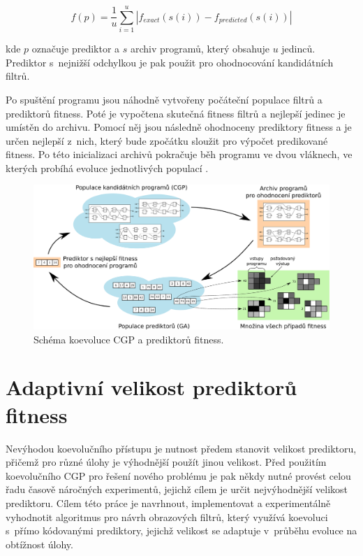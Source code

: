 \documentclass[czech]{ExcelAtFIT} %
\begin{document}
\begin{equation}
    \label{eq:fitnessPredictor}
    f \left( p \right) = \frac{1}{u} \sum\limits_{i=1}^{u} \left| f_{\mathit{exact}} \left( s\left( i \right) \right) - f_{\mathit{predicted}} \left( s\left( i \right) \right) \right|
\end{equation}

\noindent{}kde $p$ označuje prediktor a $s$ archiv programů, který obsahuje $u$ jedinců. Prediktor s~nejnižší odchylkou je pak použit pro ohodnocování kandidátních filtrů.

Po spuštění programu jsou náhodně vytvořeny po\-čá\-teč\-ní populace filtrů a prediktorů fitness. Poté je vypočtena skutečná fitness filtrů a nejlepší jedinec je umís\-těn do archivu. Pomocí něj jsou následně ohod\-no\-ceny prediktory fitness a je určen nejlepší z~nich, který bude zpočátku sloužit pro výpočet predikované fitness. Po této inicializaci archivů pokračuje běh programu ve dvou vláknech, ve kterých probíhá evoluce jed\-not\-li\-vých populací \cite{SikuPPSN}.

\begin{figure}[t]
    \centering\includegraphics[width=0.8\linewidth]{images/coevolution-if.pdf}
    \caption{Schéma koevoluce CGP a prediktorů fitness.}
    \label{fig:CoevolutionScheme}
\end{figure}



\section{Adaptivní velikost prediktorů fitness}
\label{sec:AdaptiveSize}

Nevýhodou koevolučního přístupu je nutnost předem stanovit velikost prediktoru, přičemž pro různé úlohy je výhodnější použít jinou velikost. Před použitím koevolučního CGP pro řešení nového problému je pak někdy nutné provést celou řadu časově náročných experimentů, jejichž cílem je určit nejvýhodnější velikost prediktoru. Cílem této práce je navrhnout, implementovat a experimentálně vyhodnotit algoritmus pro návrh obrazových filtrů, který využívá koevoluci s~přímo kódovanými prediktory, jejichž velikost se adaptuje v~průběhu evoluce na obtížnost úlohy.
\end{document}

